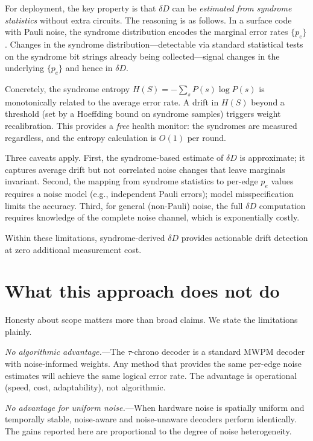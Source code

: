 \documentclass[prl,twocolumn,superscriptaddress,longbibliography]{revtex4-2}
\newcommand{\dd}{\delta\!D}
\begin{document}
For deployment, the key property is that $\dd$ can be \emph{estimated from syndrome statistics} without extra circuits. The reasoning is as follows. In a surface code with Pauli noise, the syndrome distribution encodes the marginal error rates $\{p_e\}$. Changes in the syndrome distribution---detectable via standard statistical tests on the syndrome bit strings already being collected---signal changes in the underlying $\{p_e\}$ and hence in $\dd$.

Concretely, the syndrome entropy $H(S) = -\sum_s P(s)\log P(s)$ is monotonically related to the average error rate. A drift in $H(S)$ beyond a threshold (set by a Hoeffding bound on syndrome samples) triggers weight recalibration. This provides a \emph{free} health monitor: the syndromes are measured regardless, and the entropy calculation is $O(1)$ per round.

Three caveats apply. First, the syndrome-based estimate of $\dd$ is approximate; it captures average drift but not correlated noise changes that leave marginals invariant. Second, the mapping from syndrome statistics to per-edge $p_e$ values requires a noise model (e.g., independent Pauli errors); model misspecification limits the accuracy. Third, for general (non-Pauli) noise, the full $\dd$ computation requires knowledge of the complete noise channel, which is exponentially costly.

Within these limitations, syndrome-derived $\dd$ provides actionable drift detection at zero additional measurement cost.

\section{What this approach does not do}

Honesty about scope matters more than broad claims. We state the limitations plainly.

\emph{No algorithmic advantage.}---The $\tau$-chrono decoder is a standard MWPM decoder with noise-informed weights. Any method that provides the same per-edge noise estimates will achieve the same logical error rate. The advantage is operational (speed, cost, adaptability), not algorithmic.

\emph{No advantage for uniform noise.}---When hardware noise is spatially uniform and temporally stable, noise-aware and noise-unaware decoders perform identically. The gains reported here are proportional to the degree of noise heterogeneity.
\end{document}
